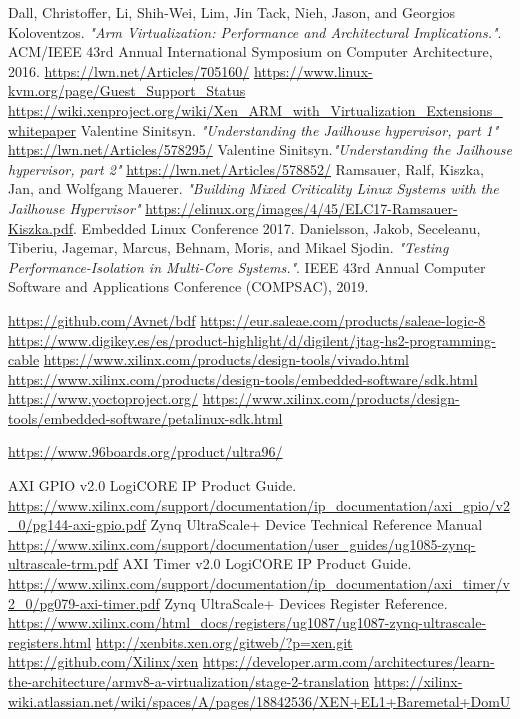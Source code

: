 \documentclass[spanish,12pt,a4paper,oneside]{book}
\begin{document}
\begin{thebibliography}{00}
   Dall, Christoffer, Li, Shih-Wei, Lim, Jin Tack, Nieh, Jason, and Georgios Koloventzos. \emph{"Arm Virtualization: Performance and Architectural Implications."}. ACM/IEEE 43rd Annual International Symposium on Computer Architecture, 2016.
	 \url{https://lwn.net/Articles/705160/}
   \url{https://www.linux-kvm.org/page/Guest_Support_Status}
   \url{https://wiki.xenproject.org/wiki/Xen_ARM_with_Virtualization_Extensions_whitepaper}
   Valentine Sinitsyn. \emph{"Understanding the Jailhouse hypervisor, part 1"} \url{https://lwn.net/Articles/578295/}
   Valentine Sinitsyn.\emph{"Understanding the Jailhouse hypervisor, part 2"} \url{https://lwn.net/Articles/578852/}
   Ramsauer, Ralf, Kiszka, Jan, and Wolfgang Mauerer. \emph{"Building Mixed Criticality Linux Systems with the Jailhouse Hypervisor"} \url{https://elinux.org/images/4/45/ELC17-Ramsauer-Kiszka.pdf}. Embedded Linux Conference 2017.
   Danielsson, Jakob, Seceleanu, Tiberiu, Jagemar, Marcus, Behnam, Moris, and Mikael Sjodin. \emph{"Testing Performance-Isolation in Multi-Core Systems."}. IEEE 43rd Annual Computer Software and Applications Conference (COMPSAC), 2019.


   \url{https://github.com/Avnet/bdf}
   \url{https://eur.saleae.com/products/saleae-logic-8}
   \url{https://www.digikey.es/es/product-highlight/d/digilent/jtag-hs2-programming-cable}
   \url{https://www.xilinx.com/products/design-tools/vivado.html}
  \url{https://www.xilinx.com/products/design-tools/embedded-software/sdk.html}
  \url{https://www.yoctoproject.org/}
  \url{https://www.xilinx.com/products/design-tools/embedded-software/petalinux-sdk.html}

   \url{https://www.96boards.org/product/ultra96/}

   AXI GPIO v2.0 LogiCORE IP Product Guide. \url{https://www.xilinx.com/support/documentation/ip_documentation/axi_gpio/v2_0/pg144-axi-gpio.pdf}
   Zynq UltraScale+ Device Technical Reference Manual \url{https://www.xilinx.com/support/documentation/user_guides/ug1085-zynq-ultrascale-trm.pdf}
   AXI Timer v2.0 LogiCORE IP Product Guide. \url{https://www.xilinx.com/support/documentation/ip_documentation/axi_timer/v2_0/pg079-axi-timer.pdf}
   Zynq UltraScale+ Devices Register Reference. \url{https://www.xilinx.com/html_docs/registers/ug1087/ug1087-zynq-ultrascale-registers.html}
   \url{http://xenbits.xen.org/gitweb/?p=xen.git}
   \url{https://github.com/Xilinx/xen}
   \url{https://developer.arm.com/architectures/learn-the-architecture/armv8-a-virtualization/stage-2-translation}
   \url{https://xilinx-wiki.atlassian.net/wiki/spaces/A/pages/18842536/XEN+EL1+Baremetal+DomU}
\end{thebibliography}
\end{document}
